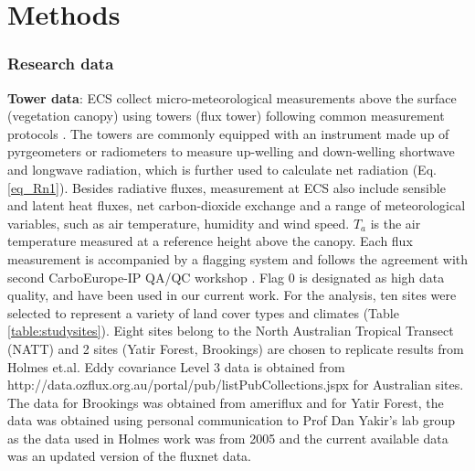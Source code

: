 \documentclass[fleqn,10pt]{wlscirep}
\begin{document}
{ 








\section{Methods}  \label{sec:Methods}
\subsubsection{Research data}
\textbf{Tower data}:
ECS collect micro-meteorological measurements above the surface (vegetation canopy) using towers (flux tower) following common measurement protocols \cite{baldocchi2001fluxnet}. The towers are commonly equipped with an instrument made up of pyrgeometers or radiometers to measure up-welling and down-welling shortwave and longwave radiation, which is further used to calculate net radiation (Eq. \ref{eq_Rn1}). Besides radiative fluxes, measurement at ECS also include sensible and latent heat fluxes, net carbon-dioxide exchange and a range of meteorological variables, such as air temperature, humidity and wind speed. $T_{a}$ is the air temperature measured at a reference height above the canopy. Each flux measurement is accompanied by a flagging system and follows the agreement with second CarboEurope-IP QA/QC workshop \cite{gilberto2020fluxnet2015}. Flag 0 is designated as high data quality, and have been used in our current work. For the analysis, ten sites were selected to represent a variety of land cover types and climates (Table \ref{table:studysites}). Eight sites belong to the North Australian Tropical Transect (NATT) and 2 sites (Yatir Forest, Brookings) are chosen to replicate results from Holmes et.al\cite{holmes_land_2009-1}. Eddy covariance Level 3 data is obtained from http://data.ozflux.org.au/portal/pub/listPubCollections.jspx for Australian sites. The data for Brookings was obtained from ameriflux and for Yatir Forest, the data was obtained using personal communication to Prof Dan Yakir's lab group as the data used in Holmes work was from 2005 \cite{holmes_land_2009} and the current available data was an updated version of the fluxnet data.%

}
\end{document}
